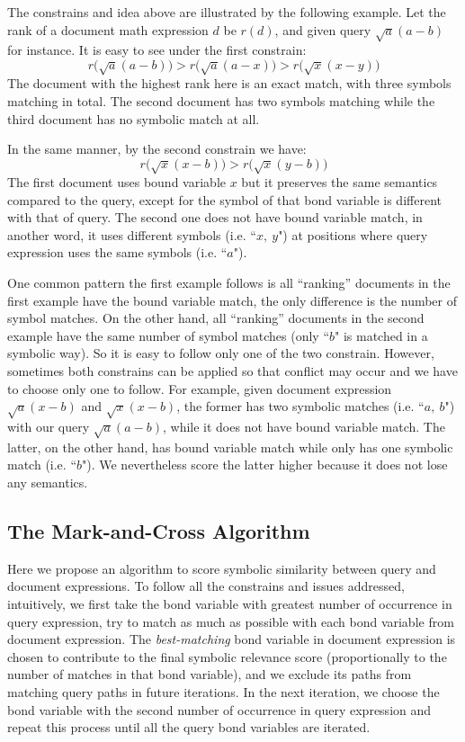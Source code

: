 The constrains and idea above are illustrated by the following example. 
Let the rank of a document math expression $d$ be $r(d)$, and given query $\sqrt a (a - b)$ for instance. 
It is easy to see under the first constrain: 
$$
r\big(\sqrt a (a - b)\big) > r\big(\sqrt a (a - x)\big) > r\big(\sqrt x (x - y)\big)
$$
The document with the highest rank here is an exact match, with three symbols matching in total. 
The second document has two symbols matching while the third document has no symbolic match at all. 

In the same manner, by the second constrain we have:
$$
r\big(\sqrt x (x - b)\big) > r\big(\sqrt x (y - b)\big)
$$
The first document uses bound variable $x$ but it preserves the same semantics compared to the query, except for the symbol of that bond variable is different with that of query.
The second one does not have bound variable match, in another word, it uses different symbols (i.e. ``$x,\ y$") at positions where query expression uses the same symbols (i.e. ``$a$").

One common pattern the first example follows is all ``ranking'' documents in the first example have the bound variable match, the only difference is the number of symbol matches. 
On the other hand, all ``ranking'' documents in the second example  have the same number of symbol matches (only ``$b$" is matched in a symbolic way). 
So it is easy to follow only one of the two constrain. 
However, sometimes both constrains can be applied so that conflict may occur and we have to choose only one to follow. 
For example, given document expression $\sqrt a (x - b)$ and $\sqrt x (x - b)$, the former has two symbolic matches (i.e. ``$a,\ b$") with our query $\sqrt a (a - b)$,
while it does not have bound variable match. 
The latter, on the other hand, has bound variable match while only has one symbolic match (i.e. ``$b$"). We nevertheless score the latter higher because it does not lose any semantics. 

\subsection{The Mark-and-Cross Algorithm}
Here we propose an algorithm to score symbolic similarity between query and document expressions.
To follow all the constrains and issues addressed, 
intuitively, we first take the bond variable with greatest number of occurrence in query expression, try to match as much as possible with each bond variable from document expression. 
The \textit{best-matching} bond variable in document expression is chosen to contribute to the final symbolic relevance score (proportionally to the number of matches in that bond variable), 
and we exclude its paths from matching query paths in future iterations.
In the next iteration, we choose the bond variable with the second number of occurrence in query expression and repeat this process until all the query bond variables are iterated.

